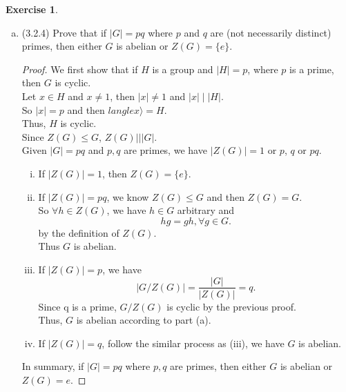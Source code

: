 \documentclass[14pt]{amsart}
\theoremstyle{plain}
\theoremstyle{definition}
\newtheorem{exer}[lem]{Exercise}
\begin{document}
\begin{exer}
\begin{enumerate}[(a)]
\item (3.2.4) Prove that if $|G|=pq$ where $p$ and $q$ are (not necessarily distinct) primes, then either $G$ is abelian or $Z(G)=\{e\}$.
  \begin{proof}
	We first show that if $H$ is a group and $|H| = p$, where $p$ is a prime, then $G$ is cyclic.\\
	Let $x \in H$ and $x \neq 1$, then $|x| \neq 1$ and $|x| \mid |H|$.\\
	So $|x| = p$ and then $langle x\rangle = H$. \\
	Thus, $H$ is cyclic.\\
	Since $Z(G) \leq G$, $Z(G)| \mid |G|$.\\
	Given $|G| =pq$ and $p,q$ are primes, we have
	$|Z(G)| = 1$ or $p$, $q$ or $pq$.\\
	\begin{enumerate}[(i)]
	  \item If $|Z(G)| = 1$, then $Z(G) = \{e\}$.
	  \item If $|Z(G)| = pq$, we know $Z(G) \leq G$ and then $Z(G) = G$.\\ 
		So $\forall h\in Z(G)$, we have $h \in G$ arbitrary and  
	  	\[ hg= gh,\forall g \in G.\] 
		by the definition of $Z(G)$.\\
		Thus $G$ is abelian.
	  \item
		If $|Z(G)| = p$, we have 
		\[|G/Z(G)| = \frac{|G|}{|Z(G)|} = q.\]
		Since q is a prime, $G/Z(G)$ is cyclic by the previous proof.\\
		Thus, $G$ is abelian according to part (a).
 	  \item 
		If $|Z(G)| = q$, follow the similar process as (iii), we have $G$ is abelian.
	\end{enumerate}
		In summary, if $|G| = pq$ where $p,q$ are primes, then either $G$ is abelian or $Z(G) = {e}$.

  \end{proof}

\end{enumerate}
\end{exer}
\end{document}
